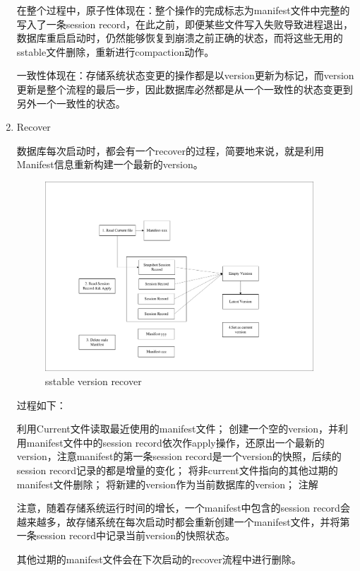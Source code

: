 \begin{enumerate}
在整个过程中，原子性体现在：整个操作的完成标志为manifest文件中完整的写入了一条session record，在此之前，即便某些文件写入失败导致进程退出，数据库重启启动时，仍然能够恢复到崩溃之前正确的状态，而将这些无用的sstable文件删除，重新进行compaction动作。

一致性体现在：存储系统状态变更的操作都是以version更新为标记，而version更新是整个流程的最后一步，因此数据库必然都是从一个一致性的状态变更到另外一个一致性的状态。


		\item Recover

数据库每次启动时，都会有一个recover的过程，简要地来说，就是利用Manifest信息重新构建一个最新的version。

\begin{figure}[H]
	\centering
	\includegraphics[width=0.95\textwidth]{pdf/version_recover.pdf}
	\caption{sstable version recover}
	\label{sstable_version_recover}
\end{figure}

过程如下：

利用Current文件读取最近使用的manifest文件；
创建一个空的version，并利用manifest文件中的session record依次作apply操作，还原出一个最新的version，注意manifest的第一条session record是一个version的快照，后续的session record记录的都是增量的变化；
将非current文件指向的其他过期的manifest文件删除；
将新建的version作为当前数据库的version；
注解

注意，随着存储系统运行时间的增长，一个manifest中包含的session record会越来越多，故存储系统在每次启动时都会重新创建一个manifest文件，并将第一条session record中记录当前version的快照状态。

其他过期的manifest文件会在下次启动的recover流程中进行删除。


\end{enumerate}
